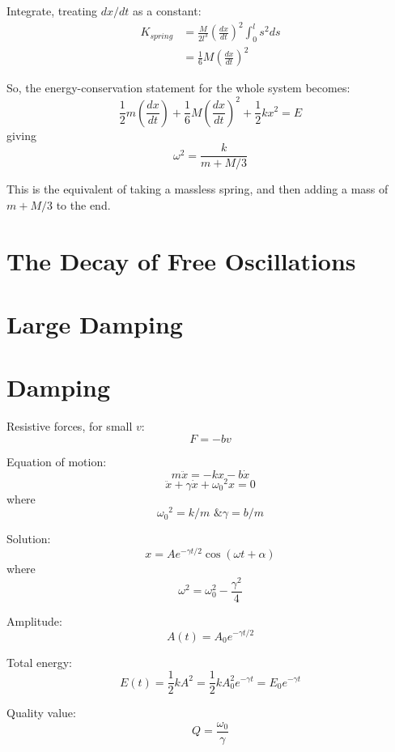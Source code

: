\documentclass[11pt,letterpaper,titlepage,oneside]{book}
\begin{document}
Integrate, treating $dx/dt$ as a constant:
\begin{align*}
K_{spring} &= \frac{M}{2l^3} \left( \frac{dx}{dt} \right)^2  \int_0^{l} s^2 ds \\
&= \frac{1}{6}M\left(\frac{dx}{dt}\right)^2
\end{align*}

So, the energy-conservation statement for the whole system becomes:
\[ \frac{1}{2}m\left(\frac{dx}{dt}\right) + \frac{1}{6}M\left( \frac{dx}{dt}\right)^2 + \frac{1}{2}kx^2 = E \]
giving
\[ \omega^2 = \frac{k}{m + M/3} \]

This is the equivalent of taking a massless spring, and then adding a mass of $m + M/3$ to the end.


\section{The Decay of Free Oscillations}

\section{Large Damping}


\section{Damping}
Resistive forces, for small $v$: \[ F=-bv \]

Equation of motion:
\[ m\ddot{x} = -kx - b\dot{x} \]
\[ \ddot{x} + \gamma \dot{x} + {\omega_0}^2 x = 0 \]
where
\[ {\omega_0}^2 = k/m \text{ \& } \gamma = b/m \]

Solution:
\[ x = A e^{-\gamma t/2} \cos(\omega t + \alpha) \]
where
\[ \omega ^2 = \omega_0^2 - \frac{\gamma^2}{4} \]

Amplitude:
\[ A(t) = A_0 e^{-\gamma t/2} \]

Total energy:
\[ E(t) = \frac{1}{2}kA^2 = \frac{1}{2}kA_0^2 e^{-\gamma t} = E_0 e^{-\gamma t} \]

Quality value:
\[ Q = \frac{\omega_0}{\gamma} \]
\end{document}
